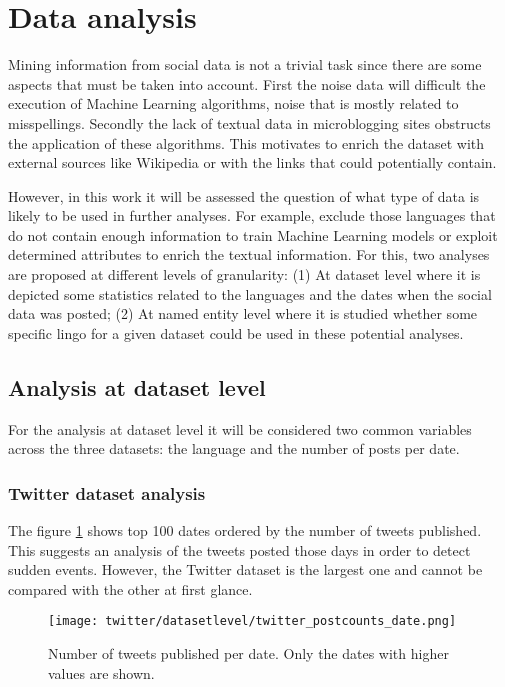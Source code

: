 \section{Data analysis}

Mining information from social data is not a trivial task since there are some aspects that must be taken into account. First the noise data will difficult the execution of Machine Learning algorithms, noise that is mostly related to misspellings. Secondly the lack of textual data in microblogging sites obstructs the application of these algorithms. This motivates to enrich the dataset with external sources like Wikipedia \citep{wikiEnrichTwitter} or with the links that could potentially contain.
\par However, in this work it will be assessed the question of what type of data is likely to be used in further analyses. For example, exclude those languages that do not contain enough information to train Machine Learning models or exploit determined attributes to enrich the textual information. For this, two analyses are proposed at different levels of granularity: (1) At dataset level where it is depicted some statistics related to the languages and the dates when the social data was posted; (2) At named entity level where it is studied whether some specific lingo for a given dataset could be used in these potential analyses.


\subsection{Analysis at dataset level}
For the analysis at dataset level it will be considered two common variables across the three datasets: the language and the number of posts per date.
\subsubsection{Twitter dataset analysis}
The figure \ref{fig:twitter_postcounts_date} shows top 100 dates ordered by the number of tweets published. This suggests an analysis of the tweets posted those days in order to detect sudden events.
However, the Twitter dataset is the largest one and cannot be compared with the other at first glance.
\begin{figure}[H]
	\begin{center}
		\texttt{[image: twitter/datasetlevel/twitter\_postcounts\_date.png]}
		\caption{Number of tweets published per date. Only the dates with higher values are shown.}
		\label{fig:twitter_postcounts_date}
	\end{center}
\end{figure}

